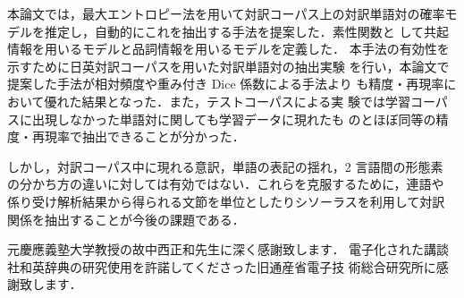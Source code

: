本論文では，最大エントロピー法を用いて対訳コーパス上の対訳単語対の確率モ
デルを推定し，自動的にこれを抽出する手法を提案した．素性関数と
して共起情報を用いるモデルと品詞情報を用いるモデルを定義した．
本手法の有効性を示すために日英対訳コーパスを用いた対訳単語対の抽出実験
を行い，本論文で提案した手法が相対頻度や重み付き Dice 係数による手法より
も精度・再現率において優れた結果となった．また，テストコーパスによる実
験では学習コーパスに出現しなかった単語対に関しても学習データに現れたも
のとほぼ同等の精度・再現率で抽出できることが分かった．

しかし，対訳コーパス中に現れる意訳，単語の表記の揺れ，2 言語間の形態素
の分かち方の違いに対しては有効ではない．これらを克服するために，連語や
係り受け解析結果から得られる文節を単位としたりシソーラスを利用して対訳
関係を抽出することが今後の課題である．

\acknowledgment

元慶應義塾大学教授の故中西正和先生に深く感謝致します．
電子化された講談社和英辞典の研究使用を許諾してくださった旧通産省電子技
術総合研究所に感謝致します．

\normalsize


\nocite{satoken_Coling98}

\newpage

\normalsize
\begin{biography}
\end{biography}



